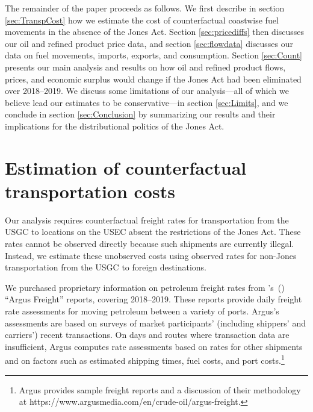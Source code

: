 \documentclass[12pt]{article}
\newcommand\cites[1]{\citeauthor{#1}'s\ (\citeyear{#1})}
\begin{document}
The remainder of the paper proceeds as follows. We first describe in section \ref{sec:TranspCost} how we estimate the cost of counterfactual coastwise fuel movements in the absence of the Jones Act. Section \ref{sec:pricediffs} then discusses our oil and refined product price data, and section \ref{sec:flowdata} discusses our data on fuel movements, imports, exports, and consumption. Section \ref{sec:Count} presents our main analysis and results on how oil and refined product flows, prices, and economic surplus would change if the Jones Act had been eliminated over 2018--2019. We discuss some limitations of our analysis---all of which we believe lead our estimates to be conservative---in section \ref{sec:Limits}, and we conclude in section \ref{sec:Conclusion} by summarizing our results and their implications for the distributional politics of the Jones Act.



\section{Estimation of counterfactual transportation costs \label{sec:TranspCost}}

Our analysis requires counterfactual freight rates for transportation from the USGC to locations on the USEC absent the restrictions of the Jones Act. These rates cannot be observed directly because such shipments are currently illegal. Instead, we estimate these unobserved costs using observed rates for non-Jones transportation from the USGC to foreign destinations.

We purchased proprietary information on petroleum freight rates from \cites{Argus2021} ``Argus Freight'' reports, covering 2018--2019. These reports provide daily freight rate assessments for moving petroleum between a variety of ports. Argus's assessments are based on surveys of market participants' (including shippers' and carriers') recent transactions. On days and routes where transaction data are insufficient, Argus computes rate assessments based on rates for other shipments and on factors such as estimated shipping times, fuel costs, and port costs.\footnote{Argus provides sample freight reports and a discussion of their methodology at https://www.argusmedia.com/en/crude-oil/argus-freight.}  
\end{document}
